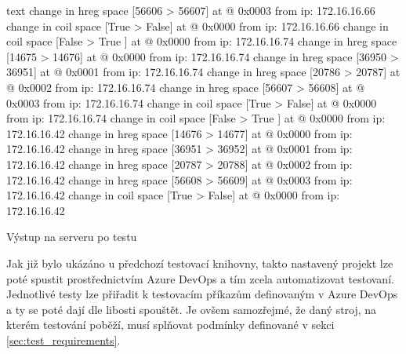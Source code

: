 \begin{listing}[htbp]
\begin{cminted}[breaklines,autogobble, fontsize=\footnotesize]{text}
        change in hreg space [56606 > 56607] at @ 0x0003 from ip: 172.16.16.66   
        change in coil space [True  > False] at @ 0x0000 from ip: 172.16.16.66   
        change in coil space [False > True ] at @ 0x0000 from ip: 172.16.16.74   
        change in hreg space [14675 > 14676] at @ 0x0000 from ip: 172.16.16.74   
        change in hreg space [36950 > 36951] at @ 0x0001 from ip: 172.16.16.74   
        change in hreg space [20786 > 20787] at @ 0x0002 from ip: 172.16.16.74   
        change in hreg space [56607 > 56608] at @ 0x0003 from ip: 172.16.16.74   
        change in coil space [True  > False] at @ 0x0000 from ip: 172.16.16.74   
        change in coil space [False > True ] at @ 0x0000 from ip: 172.16.16.42   
        change in hreg space [14676 > 14677] at @ 0x0000 from ip: 172.16.16.42   
        change in hreg space [36951 > 36952] at @ 0x0001 from ip: 172.16.16.42   
        change in hreg space [20787 > 20788] at @ 0x0002 from ip: 172.16.16.42   
        change in hreg space [56608 > 56609] at @ 0x0003 from ip: 172.16.16.42   
        change in coil space [True  > False] at @ 0x0000 from ip: 172.16.16.42   
    \end{cminted}
\caption{Výstup na serveru po testu}
\label{listing:modbus_server_log}
\end{listing}

Jak již bylo ukázáno u předchozí testovací knihovny\cite{bakalarka}, takto nastavený projekt lze poté spustit prostřednictvím Azure DevOps a tím zcela automatizovat testovaní. Jednotlivé testy lze přiřadit k testovacím příkazům definovaným v Azure DevOps a ty se poté dají dle libosti spouštět. Je ovšem samozřejmé, že daný stroj, na kterém testování poběží, musí splňovat podmínky definované v sekci \ref{sec:test_requirements}.

